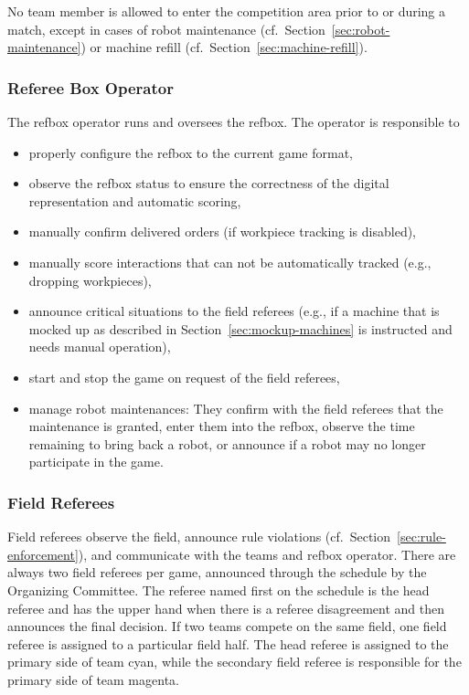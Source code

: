 \documentclass[12pt,twoside]{article}
\newcommand{\refsec}[1]{Section~\ref{#1}}
\begin{document}
No team member is allowed to enter the competition area prior to or
during a match, except in cases of robot maintenance
(cf.~\refsec{sec:robot-maintenance}) or machine refill
(cf.~\refsec{sec:machine-refill}).

\subsubsection{Referee Box Operator}
The \ac{refbox} operator runs and oversees the \ac{refbox}.
The operator is responsible to
\begin{itemize} \itemsep0em
  \item properly configure the \ac{refbox} to the current game format,
  \item observe the \ac{refbox} status to ensure the correctness of
    the digital representation and automatic scoring,
  \item manually confirm delivered orders (if workpiece tracking is disabled),
  \item manually score interactions that can not be automatically tracked
        (e.g., dropping workpieces),
  \item announce critical situations to the field referees (e.g., if a machine
    that is mocked up as described in \refsec{sec:mockup-machines} is
    instructed and needs manual operation),
  \item start and stop the game on request of the field referees,
  \item manage robot maintenances:
    They confirm with the field referees that the maintenance is granted,
    enter them into the \ac{refbox},
    observe the time remaining to bring back a robot,
    or announce if a robot may no longer participate in the game.
\end{itemize}

\subsubsection{Field Referees}
Field referees observe the field, announce rule
violations (cf.~\refsec{sec:rule-enforcement}), and communicate with the teams
and \ac{refbox} operator.
There are always two field referees per game, announced through the schedule
by the Organizing Committee.
The referee named first on the schedule is the head referee and has the upper
hand when there is a referee disagreement and then announces
the final decision.
If two teams compete on the same field, one field referee is assigned to a
particular field half.
The head referee is assigned to the primary side of team cyan, while the
secondary field referee is responsible for the primary side of team magenta.
\end{document}
